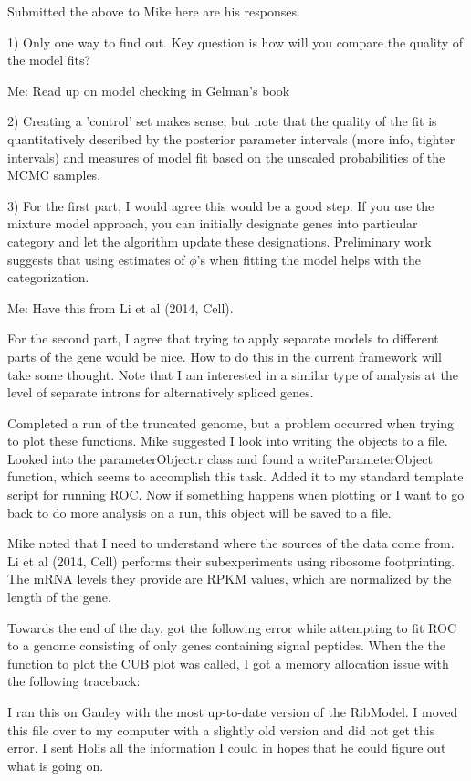 \documentclass[11pt]{labbook}
\begin{document}
Submitted the above to Mike here are his responses.

1) Only one way to find out.  Key question is how will you compare the quality of the model fits? 

Me: Read up on model checking in Gelman's book

2) Creating a 'control' set makes sense, but note that the quality of the fit is quantitatively described by the  posterior parameter intervals (more info, tighter intervals) and measures of model fit based on the unscaled probabilities of the MCMC samples.

3) For the first part, I would agree this would be a good step. If you use the mixture model approach, you can initially designate genes into particular category and let the algorithm update these designations.  Preliminary work 
suggests that using estimates of $\phi$'s when fitting the model helps with the categorization.

Me: Have this from Li et al (2014, Cell). 

For the second part, I agree that trying to apply separate models to different parts of the gene would be nice.  How to do this in the current framework will take some thought.  Note that I am interested in a similar type of analysis at the level of separate introns for alternatively spliced 
genes. 

Completed a run of the truncated genome, but a problem occurred when trying to plot these functions. Mike suggested I look into writing the objects to a file. Looked into the parameterObject.r class and found a writeParameterObject function, which seems to accomplish this task. Added it to my standard template script for running ROC. Now if something happens when plotting or I want to go back to do more analysis on a run, this object will be saved to a file. 

Mike noted that I need to understand where the sources of the data come from. Li et al (2014, Cell) performs their subexperiments using ribosome footprinting. The mRNA levels they provide are RPKM values, which are normalized by the length of the gene. 


Towards the end of the day, got the following error while attempting to fit ROC to a genome consisting of only genes containing signal peptides. When the the function to plot the CUB plot was called, I got a memory allocation issue with the following traceback:


I ran this on Gauley with the most up-to-date version of the RibModel. I moved this file over to my computer with a slightly old version and did not get this error. I sent Holis all the information I could in hopes that he could figure out what is going on.
\end{document}
